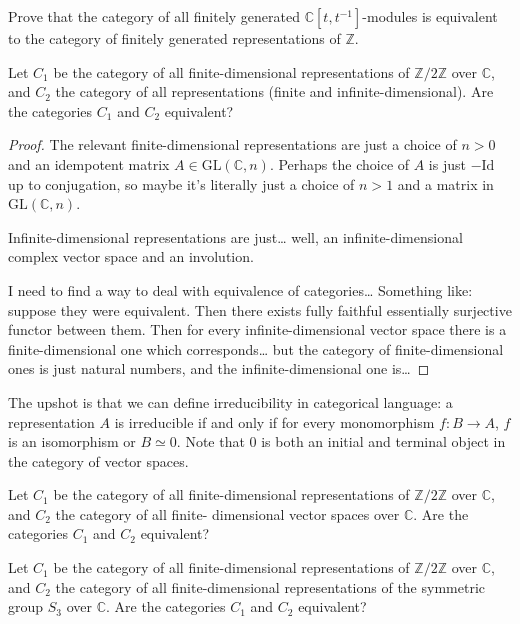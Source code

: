 \begin{exercise}
\label{exercise-fg-c-t-inv-modules-z-reps}
Prove that the category of all finitely
generated $\mathbb{C}[t,t^{-1}]$-modules is
equivalent to the category of finitely
generated representations of $\mathbb{Z}$.
\end{exercise}

\begin{exercise}
\label{exercise-z2-reps-fd-vs-all}
Let $C_1$ be the category of all
finite-dimensional representations of
$\mathbb{Z}/2\mathbb{Z}$ over $\mathbb{C}$,
and $C_2$ the category of all
representations (finite and
infinite-dimensional). Are the categories
$C_1$ and $C_2$ equivalent?
\end{exercise}

\begin{proof}
The relevant
finite-dimensional representations
are just a choice of $n>0$ and
an idempotent matrix $A \in
\text{GL}(\mathbb{C},n)$.
Perhaps the choice of $A$
is just $-\text{Id}$ up
to conjugation,
so maybe it's literally just
a choice of $n>1$ and a matrix in
$\text{GL}(\mathbb{C},n)$.

Infinite-dimensional representations
are just… well, an infinite-dimensional
complex vector space and an involution.

I need to find a way to deal
with equivalence of categories…
Something like: suppose they were
equivalent. Then there exists fully
faithful essentially surjective functor
between them.
Then for every infinite-dimensional
vector space there is a finite-dimensional
one which corresponds…
but the category of finite-dimensional
ones is just natural numbers,
and the infinite-dimensional one
is…
\end{proof}

\noindent
The upshot is that 
we can define irreducibility
in categorical language:
a representation $A$
is irreducible if and only if for every
monomorphism $f:B \to A$,
$f$ is an isomorphism or $B \simeq 0$.
Note that $0$ is both an initial
and terminal object in the category
of vector spaces.

\begin{exercise}
\label{exercise-z2-reps-vs-vect}
Let $C_1$ be the category of all
finite-dimensional representations of
$\mathbb{Z}/2\mathbb{Z}$ over $\mathbb{C}$,
and $C_2$ the category of all finite-
dimensional vector spaces over
$\mathbb{C}$. Are the categories $C_1$ and
$C_2$ equivalent?
\end{exercise}

\begin{exercise}
\label{exercise-z2-vs-s3-reps}
Let $C_1$ be the category of all
finite-dimensional representations of
$\mathbb{Z}/2\mathbb{Z}$ over $\mathbb{C}$,
and $C_2$ the category of all
finite-dimensional representations of the
symmetric group $S_3$ over $\mathbb{C}$.
Are the categories $C_1$ and $C_2$
equivalent?
\end{exercise}


